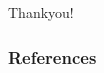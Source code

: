 \documentclass{beamer}
\begin{document}


\begin{frame}
\Huge{\centerline{Thankyou!}}
\end{frame}


\begin{frame}[t, allowframebreaks]
\frametitle{References}


\end{frame}




\end{document}
